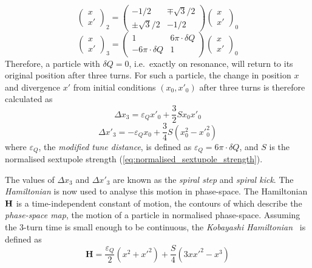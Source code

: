 \documentclass[a4paper,twoside,11pt]{report}
\begin{document}
\begin{equation}
  \begin{pmatrix}
    x\\x'
  \end{pmatrix}_2=
  \begin{pmatrix}
    -1/2 & \mp\sqrt{3}/2 \\
    \pm\sqrt{3}/2 & -1/2
  \end{pmatrix}\begin{pmatrix}
    x\\x'
  \end{pmatrix}_0
\end{equation}
\begin{equation}
  \begin{pmatrix}
    x\\x'
  \end{pmatrix}_3=
  \begin{pmatrix}
    1 & 6\pi\cdot\delta Q \\
    -6\pi\cdot\delta Q & 1
  \end{pmatrix}\begin{pmatrix}
    x\\x'
  \end{pmatrix}_0
\end{equation}
Therefore, a particle with $\delta Q=0$, i.e.\ exactly on resonance, will return to its original position after three turns. For such a particle, the change in position $x$ and divergence $x'$ from initial conditions $(x_0, x'_0)$ after three turns is therefore calculated as
\begin{equation}
  \Delta x_3 = {\varepsilon_Q} x'_0 + \frac 32 S x_0x'_0
  \label{eq:spiral_step}
\end{equation}
\begin{equation}
  \Delta x'_3 = -{\varepsilon_Q} x_0 + \frac 34 S (x_0^2-x'^2_0)
  \label{eq:spiral_kick}
\end{equation}
where ${\varepsilon_Q}$, the \textit{modified tune distance}, is defined as ${\varepsilon_Q} = 6\pi\cdot\delta Q$, and $S$ is the normalised sextupole strength (\autoref{eq:normalised_sextupole_strength}).

The values of $\Delta x_3$ and $\Delta x'_3$ are known as the \textit{spiral step} and \textit{spiral kick}.
The \textit{Hamiltonian} is now used to analyse this motion in phase-space. The Hamiltonian $\bf H$ is a time-independent constant of motion, the contours of which describe the \textit{phase-space map}, the motion of a particle in normalised phase-space. Assuming the 3-turn time is small enough to be continuous, the \textit{Kobayashi Hamiltonian}~\cite{kobayashi} is defined as
\begin{equation}
  \textbf{H} =\frac{\varepsilon_Q} 2(x^2+x'^2)+\frac S4(3xx'^2-x^3)
\end{equation}
\end{document}
